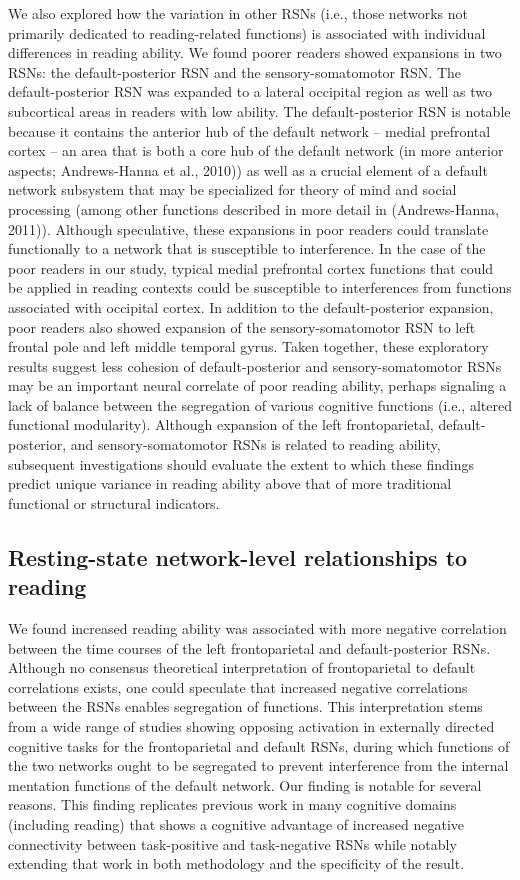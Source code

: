 We also explored how the variation in other RSNs (i.e., those networks not primarily dedicated to reading-related functions) is associated with individual differences in reading ability. We found poorer readers showed expansions in two RSNs: the default-posterior RSN and the sensory-somatomotor RSN. The default-posterior RSN was expanded to a lateral occipital region as well as two subcortical areas in readers with low ability. The default-posterior RSN is notable because it contains the anterior hub of the default network – medial prefrontal cortex – an area that is both a core hub of the default network (in more anterior aspects; Andrews-Hanna et al., 2010)) as well as a crucial element of a default network subsystem that may be specialized for theory of mind and social processing (among other functions described in more detail in (Andrews-Hanna, 2011)). Although speculative, these expansions in poor readers could translate functionally to a network that is susceptible to interference. In the case of the poor readers in our study, typical medial prefrontal cortex functions that could be applied in reading contexts could be susceptible to interferences from functions associated with occipital cortex. In addition to the default-posterior expansion, poor readers also showed expansion of the sensory-somatomotor RSN to left frontal pole and left middle temporal gyrus. Taken together, these exploratory results suggest less cohesion of default-posterior and sensory-somatomotor RSNs may be an important neural correlate of poor reading ability, perhaps signaling a lack of balance between the segregation of various cognitive functions (i.e., altered functional modularity). Although expansion of the left frontoparietal, default-posterior, and sensory-somatomotor RSNs is related to reading ability, subsequent investigations should evaluate the extent to which these findings predict unique variance in reading ability above that of more traditional functional or structural indicators.

\subsection{Resting-state network-level relationships to reading}
    
We found increased reading ability was associated with more negative correlation between the time courses of the left frontoparietal and default-posterior RSNs. Although no consensus theoretical interpretation of frontoparietal to default correlations exists, one could speculate that increased negative correlations between the RSNs enables segregation of functions. This interpretation stems from a wide range of studies showing opposing activation in externally directed cognitive tasks for the frontoparietal and default RSNs, during which functions of the two networks ought to be segregated to prevent interference from the internal mentation functions of the default network. Our finding is notable for several reasons. This finding replicates previous work in many cognitive domains (including reading) that shows a cognitive advantage of increased negative connectivity between task-positive and task-negative RSNs while notably extending that work in both methodology and the specificity of the result. 

